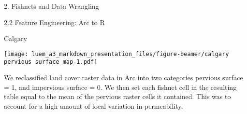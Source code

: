 \documentclass[
  ignorenonframetext,
]{beamer}
\newenvironment{Shaded}{\begin{snugshade}}{\end{snugshade}}
\newcommand{\AttributeTok}[1]{\textcolor[rgb]{0.77,0.63,0.00}{#1}}
\newcommand{\ConstantTok}[1]{\textcolor[rgb]{0.00,0.00,0.00}{#1}}
\newcommand{\DecValTok}[1]{\textcolor[rgb]{0.00,0.00,0.81}{#1}}
\newcommand{\FloatTok}[1]{\textcolor[rgb]{0.00,0.00,0.81}{#1}}
\newcommand{\FunctionTok}[1]{\textcolor[rgb]{0.00,0.00,0.00}{#1}}
\newcommand{\NormalTok}[1]{#1}
\newcommand{\SpecialCharTok}[1]{\textcolor[rgb]{0.00,0.00,0.00}{#1}}
\newcommand{\StringTok}[1]{\textcolor[rgb]{0.31,0.60,0.02}{#1}}
\begin{document}
\begin{frame}[fragile]{2. Fishnets and Data Wrangling}
\begin{block}{2.2 Feature Engineering: Arc to R}
\begin{block}{Calgary}
\begin{Shaded}
\end{Shaded}

\texttt{[image: luem\_a3\_markdown\_presentation\_files/figure-beamer/calgary pervious surface map-1.pdf]}

We reclassified land cover raster data in Arc into two categories
pervious surface = 1, and impervious surface = 0. We then set each
fishnet cell in the resulting table equal to the mean of the pervious
raster cells it contained. This was to account for a high amount of
local variation in permeability.


\end{block}
\end{block}
\end{frame}
\end{document}
